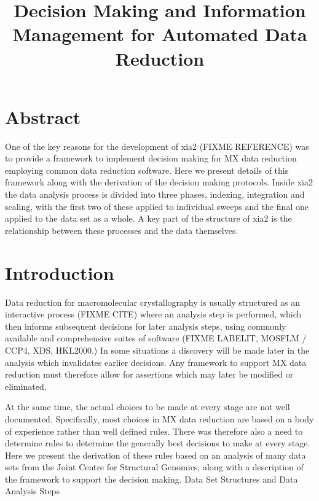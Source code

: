 \documentclass[a4paper, 11pt]{article}
\title{Decision Making and Information Management for Automated Data Reduction}
\begin{document}
\maketitle

\section{Abstract}

One of the key reasons for the development of xia2 (FIXME REFERENCE) was to provide a framework to implement decision making for MX data reduction employing common data reduction software. Here we present details of this framework along with the derivation of the decision making protocols. Inside xia2 the data analysis process is divided into three phases, indexing, integration and scaling, with the first two of these applied to individual sweeps and the final one applied to the data set as a whole. A key part of the structure of xia2 is the relationship between these processes and the data themselves.

\section{Introduction}

Data reduction for macromolecular crystallography is usually structured as an interactive process (FIXME CITE) where an analysis step is performed, which then informs subsequent decisions for later analysis steps, using commonly available and comprehensive suites of software (FIXME LABELIT, MOSFLM / CCP4, XDS, HKL2000.) In some situations a discovery will be made later in the analysis which invalidates earlier decisions. Any framework to support MX data reduction must therefore allow for assertions which may later be modified or eliminated. 

At the same time, the actual choices to be made at every stage are not well documented. Specifically, most choices in MX data reduction are based on a body of experience rather than well defined rules. There was therefore also a need to determine rules to determine the generally best decisions to make at every stage. Here we present the derivation of these rules based on an analysis of many data sets from the Joint Centre for Structural Genomics, along with a description of the framework to support the decision making.
Data Set Structures and Data Analysis Steps
\end{document}

